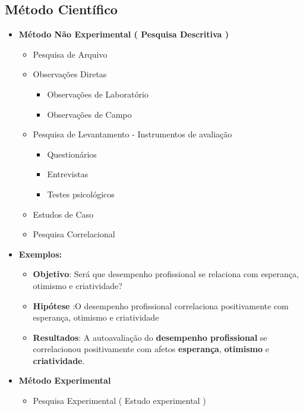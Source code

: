 \documentclass[
]{book}
\providecommand{\tightlist}{%
  \setlength{\itemsep}{0pt}\setlength{\parskip}{0pt}}
\begin{document}
\hypertarget{muxe9todo-cientuxedfico}{%
\subsection{Método Científico}\label{muxe9todo-cientuxedfico}}

\begin{itemize}
\tightlist
\item
  \textbf{Método Não Experimental ( Pesquisa Descritiva )}

  \begin{itemize}
  \tightlist
  \item
    Pesquisa de Arquivo
  \item
    Observações Diretas

    \begin{itemize}
    \tightlist
    \item
      Observações de Laboratório
    \item
      Observações de Campo
    \end{itemize}
  \item
    Pesquisa de Levantamento - Instrumentos de avaliação

    \begin{itemize}
    \tightlist
    \item
      Questionários
    \item
      Entrevistas
    \item
      Testes psicológicos
    \end{itemize}
  \item
    Estudos de Caso
  \item
    Pesquisa Correlacional
  \end{itemize}
\item
  \textbf{Exemplos:}

  \begin{itemize}
  \tightlist
  \item
    \textbf{Objetivo}: Será que desempenho profissional se relaciona com esperança, otimismo e criatividade?
  \item
    \textbf{Hipótese} :O desempenho profissional correlaciona positivamente com esperança, otimismo e criatividade
  \item
    \textbf{Resultados}: A autoavaliação do \textbf{desempenho profissional} se correlacionou positivamente com afetos \textbf{esperança}, \textbf{otimismo} e \textbf{criatividade}.
  \end{itemize}
\item
  \textbf{Método Experimental}

  \begin{itemize}
  \tightlist
  \item
    Pesquisa Experimental ( Estudo experimental )
  \end{itemize}
\end{itemize}
\end{document}
